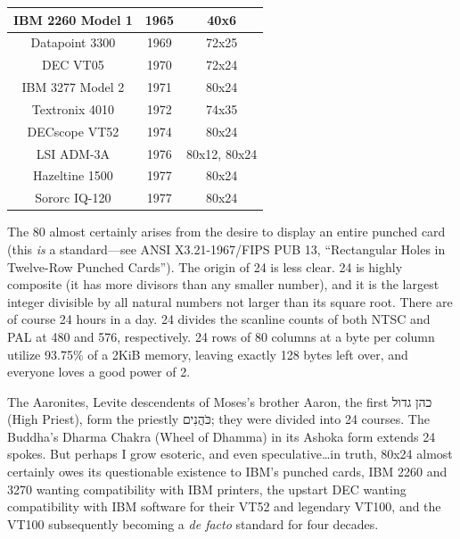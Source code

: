\documentclass[letterpaper,10pt]{article}
\begin{document}
\begin{appendices}
\vspace{.25in}

\begin{center}
  \begin{tabular}{ |c|c|c| }
    \hline
    IBM 2260 Model 1 & 1965 & 40x6 \\
    \hline
    Datapoint 3300 & 1969 & 72x25 \\
    \hline
    DEC VT05 & 1970 & 72x24 \\
    \hline
    IBM 3277 Model 2 & 1971 & 80x24 \\
    \hline
    Textronix 4010 & 1972 & 74x35 \\
    \hline
    DECscope VT52 & 1974 & 80x24 \\
    \hline
    LSI ADM-3A & 1976 & 80x12, 80x24 \\
    \hline
    Hazeltine 1500 & 1977 & 80x24 \\
    \hline
    Sororc IQ-120 & 1977 & 80x24 \\
    \hline
  \end{tabular}
\end{center}

\vspace{.25in}

The 80 almost certainly arises from the desire to display an entire punched card
(this \textit{is} a standard---see ANSI X3.21-1967/FIPS PUB 13, ``Rectangular
Holes in Twelve-Row Punched Cards'')\cite{sonicdelay}. The origin of 24 is less
clear. 24 is highly composite (it has more divisors than any smaller number),
and it is the largest integer divisible by all natural numbers not larger than its
square root. There are of course 24 hours in a day. 24 divides the scanline
counts of both NTSC and PAL at 480 and 576, respectively. 24 rows of
80 columns at a byte per column utilize 93.75\% of a 2KiB memory, leaving exactly
128 bytes left over, and everyone loves a good power of 2.

The Aaronites, Levite descendents of Moses's brother Aaron, the first
\texthebrew{כהן גדול}
(High Priest),
form the priestly \texthebrew{כֹּהֲנִים}; they were divided into 24 courses. The Buddha's Dharma Chakra (Wheel of Dhamma)
in its Ashoka form extends 24 spokes. But perhaps I grow esoteric, and even
speculative\ldots in truth, 80x24 almost certainly owes its questionable
existence to IBM's punched cards, IBM 2260 and 3270 wanting compatibility with
IBM printers, the upstart DEC wanting compatibility with IBM software for their
VT52 and legendary VT100, and the VT100 subsequently becoming a \textit{de facto} standard for
four decades.


\end{appendices}
\end{document}
